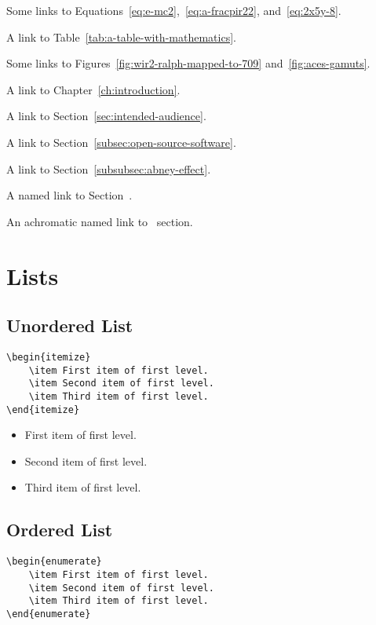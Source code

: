 Some links to Equations~\ref{eq:e-mc2},~\ref{eq:a-fracpir22}, and~\ref{eq:2x5y-8}.

A link to Table~\ref{tab:a-table-with-mathematics}.

Some links to Figures~\ref{fig:wir2-ralph-mapped-to-709} and~\ref{fig:aces-gamuts}.

A link to Chapter~\ref{ch:introduction}.

A link to Section~\ref{sec:intended-audience}.

A link to Section~\ref{subsec:open-source-software}.

A link to Section~\ref{subsubsec:abney-effect}.

A named link to Section~.

An achromatic named link to~ section.

\section*{Lists}%
\label{sec:lists}

\subsection*{Unordered List}%
\label{subsec:unordered-list}

\begin{lstlisting}[caption={An unordered list.}]
\begin{itemize}
    \item First item of first level.
    \item Second item of first level.
    \item Third item of first level.
\end{itemize}
\end{lstlisting}

\begin{itemize}
    \item First item of first level.
    \item Second item of first level.
    \item Third item of first level.
\end{itemize}

\subsection*{Ordered List}%
\label{subsec:ordered-list}

\begin{lstlisting}[caption={An ordered list.}]
\begin{enumerate}
    \item First item of first level.
    \item Second item of first level.
    \item Third item of first level.
\end{enumerate}
\end{lstlisting}

